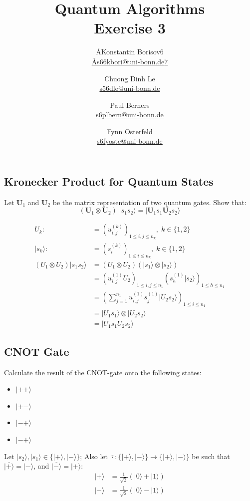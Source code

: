 \documentclass{article}
\title{Quantum Algorithms \\ Exercise 3}
\author{
  \AA{Konstantin Borisov}{6} \\ \href{mailto:\AA{s66kbori@uni-bonn.de}{7}}{\AA{s66kbori@uni-bonn.de}{7}} \and
  Chuong Dinh Le \\ \href{mailto:s56dle@uni-bonn.de}{s56dle@uni-bonn.de} \and
  Paul Berners \\ \href{mailto:s6plbern@uni-bonn.de}{s6plbern@uni-bonn.de} \and
  Fynn Osterfeld \\ \href{mailto:s6fyoste@uni-bonn.de}{s6fyoste@uni-bonn.de}
}
\begin{document}
  \maketitle

  \setcounter{section}{3}
  \subsection{Kronecker Product for Quantum States}
  \begin{centerframebox}
    Let $\mathbf{U}_1$ and $\mathbf{U}_2$ be the matrix representation of two quantum gates. Show that:
    \[ (\mathbf{U}_{1}\otimes\mathbf{U}_{2})\; |s_{1}s_{2}\rangle = |\mathbf{U}_{1}s_{1}\mathbf{U}_{2}s_{2}\rangle \]
  \end{centerframebox}

  \begin{align*}
      U_k :&= \left(u_{i, j}^{(k)}\right)_{1\leq i, j\leq n_k},\; k\in \{1, 2\}\\
      |s_k\rangle :&= \left(s_i^{(k)}\right)_{1\leq i \leq n_k},\; k\in \{1, 2\}\\
      (U_1 \otimes U_2)|s_1s_2\rangle &= (U_1 \otimes U_2)(|s_1\rangle \otimes |s_2\rangle)\\
      &= \left(u_{i, j}^{(1)}U_2\right)_{1\leq i, j\leq n_1}  \left(s_h^{(1)}|s_2\rangle\right)_{1\leq h\leq n_1}\\
      &= \left(\sum_{j=1}^{n_1}u_{i, j}^{(1)}s_j^{(1)}|U_2s_2\rangle\right)_{1\leq i\leq n_1}\\
      &= |U_1s_1\rangle \otimes |U_2s_2\rangle\\
      &= |U_1s_1U_2s_2\rangle
  \end{align*}

  \subsection{CNOT Gate}
  \begin{centerframebox}
    Calculate the result of the CNOT-gate onto the following states:
    \begin{itemize}
      \item $|++\rangle$
      \item $|+-\rangle$
      \item $|-+\rangle$
      \item $|-+\rangle$
    \end{itemize}
  \end{centerframebox}

  Let $|s_2\rangle, |s_1\rangle \in \{|+\rangle, |-\rangle\}$; Also let $\overline{\cdot}: \{|+\rangle, |-\rangle\} \rightarrow \{|+\rangle, |-\rangle\}$ be such that $\overline{|+\rangle} = |-\rangle$, and $\overline{|-\rangle} = |+\rangle$:
  \begin{align*}
    |+\rangle &= \frac{1}{\sqrt{2}}(|0\rangle + |1\rangle)\\
    |-\rangle &= \frac{1}{\sqrt{2}}(|0\rangle - |1\rangle)
  \end{align*}
\end{document}
